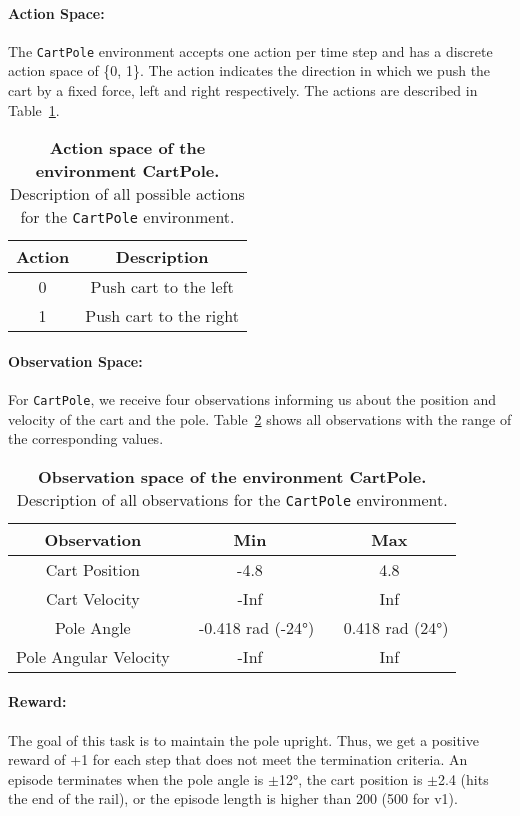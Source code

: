 \paragraph*{Action Space:} The \verb|CartPole| environment accepts one action per time step and has a discrete action space of \{0, 1\}. The action indicates the direction in which we push the cart by a fixed force, left and right respectively. The actions are described in Table~\ref{table:cartpole_act}.
\begin{table}[!ht]
  \centering
  \begin{tabular}{ |c|c| }
    \hline
    Action & Description \\
    \hline
    0 & Push cart to the left \\
    1 & Push cart to the right \\
    \hline
  \end{tabular}
  \caption[Action space of the environment CartPole]{
    \textbf{Action space of the environment CartPole.}
    Description of all possible actions for the \texttt{CartPole} environment.
  }
  \label{table:cartpole_act}
\end{table}

\paragraph*{Observation Space:} For \verb|CartPole|, we receive four observations informing us about the position and velocity of the cart and the pole. Table~\ref{table:cartpole_obs} shows all observations with the range of the corresponding values.
\begin{table}[!ht]
  \centering
  \begin{tabular}{ |c|c|c| }
    \hline
    Observation & Min & Max \\
    \hline
    Cart Position & -4.8 & 4.8 \\
    Cart Velocity & -Inf & Inf \\
    Pole Angle & ~ -0.418 rad (-24°) & ~ 0.418 rad (24°) \\
    Pole Angular Velocity & -Inf & Inf \\
    \hline
  \end{tabular}
  \caption[Observation space of the environment CartPole]{
    \textbf{Observation space of the environment CartPole.}
    Description of all observations for the \texttt{CartPole} environment.
  }
  \label{table:cartpole_obs}
\end{table}

\paragraph*{Reward:} The goal of this task is to maintain the pole upright. Thus, we get a positive reward of +1 for each step that does not meet the termination criteria. An episode terminates when the pole angle is $\pm$12°, the cart position is $\pm$2.4 (hits the end of the rail), or the episode length is higher than 200 (500 for v1).

